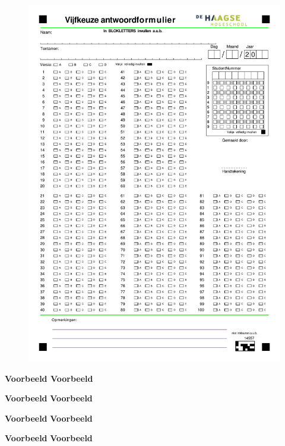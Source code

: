 \documentclass[a4paper,12pt,fleqn,dutch,mimicwordtwentyten]{tisdexam}
\begin{document}
\begin{figure}[h!]
  \centering
  \includegraphics*[viewport=0 0 600 200,scale=0.80]{vijfkeuze_nl.pdf}
\end{figure}

{\fontsize{11pt}{12pt}\selectfont\bfseries
{}
\par}

\vspace*{-10cm}
{\fontsize{11pt}{12pt}\selectfont\bfseries
\Huge{\textbf{Voorbeeld}}
\Huge{\textbf{Voorbeeld}}

\Huge{\textbf{Voorbeeld}}
\Huge{\textbf{Voorbeeld}}

\Huge{\textbf{Voorbeeld}}
\Huge{\textbf{Voorbeeld}}

\Huge{\textbf{Voorbeeld}}
\Huge{\textbf{Voorbeeld}}
\par}
\newpage
\end{document}
